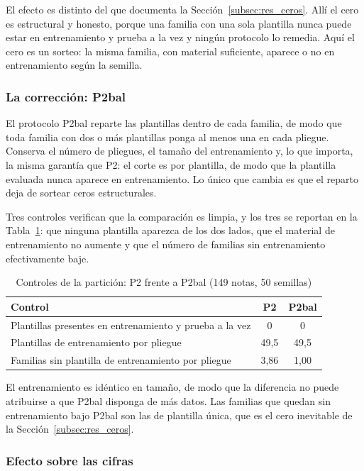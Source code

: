 El efecto es distinto del que documenta la Sección~\ref{subsec:res_ceros}. Allí el cero es estructural y honesto, porque una familia con una sola plantilla nunca puede estar en entrenamiento y prueba a la vez y ningún protocolo lo remedia. Aquí el cero es un sorteo: la misma familia, con material suficiente, aparece o no en entrenamiento según la semilla.

\subsubsection*{La corrección: P2bal}

El protocolo P2bal reparte las plantillas dentro de cada familia, de modo que toda familia con dos o más plantillas ponga al menos una en cada pliegue. Conserva el número de pliegues, el tamaño del entrenamiento y, lo que importa, la misma garantía que P2: el corte es por plantilla, de modo que la plantilla evaluada nunca aparece en entrenamiento. Lo único que cambia es que el reparto deja de sortear ceros estructurales.

Tres controles verifican que la comparación es limpia, y los tres se reportan en la Tabla~\ref{tab:p2bal_controles}: que ninguna plantilla aparezca de los dos lados, que el material de entrenamiento no aumente y que el número de familias sin entrenamiento efectivamente baje.

\begin{table}[ht]
\centering
\caption{Controles de la partición: P2 frente a P2bal (149 notas, 50 semillas)}
\label{tab:p2bal_controles}
\begin{tabular}{|l|c|c|}
\hline
\textbf{Control} & \textbf{P2} & \textbf{P2bal} \\
\hline
Plantillas presentes en entrenamiento y prueba a la vez & 0 & 0 \\
Plantillas de entrenamiento por pliegue & 49,5 & 49,5 \\
Familias sin plantilla de entrenamiento por pliegue & 3,86 & 1,00 \\
\hline
\end{tabular}
\end{table}

El entrenamiento es idéntico en tamaño, de modo que la diferencia no puede atribuirse a que P2bal disponga de más datos. Las familias que quedan sin entrenamiento bajo P2bal son las de plantilla única, que es el cero inevitable de la Sección~\ref{subsec:res_ceros}.

\subsubsection*{Efecto sobre las cifras}

